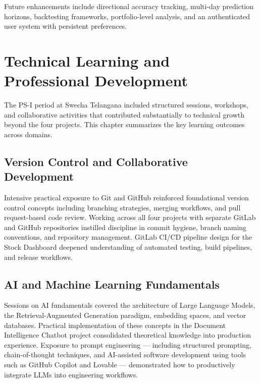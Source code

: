 \documentclass{book}
\begin{document}
\par\noindent Future enhancements include directional accuracy tracking, multi-day prediction horizons, backtesting frameworks, portfolio-level analysis, and an authenticated user system with persistent preferences.

\chapter{Technical Learning and Professional Development}

\par\noindent The PS-I period at Swecha Telangana included structured sessions, workshops, and collaborative activities that contributed substantially to technical growth beyond the four projects. This chapter summarizes the key learning outcomes across domains.

\section{Version Control and Collaborative Development}

\par\noindent Intensive practical exposure to Git and GitHub reinforced foundational version control concepts including branching strategies, merging workflows, and pull request-based code review. Working across all four projects with separate GitLab and GitHub repositories instilled discipline in commit hygiene, branch naming conventions, and repository management. GitLab CI/CD pipeline design for the Stock Dashboard deepened understanding of automated testing, build pipelines, and release workflows.

\section{AI and Machine Learning Fundamentals}

\par\noindent Sessions on AI fundamentals covered the architecture of Large Language Models, the Retrieval-Augmented Generation paradigm, embedding spaces, and vector databases. Practical implementation of these concepts in the Document Intelligence Chatbot project consolidated theoretical knowledge into production experience. Exposure to prompt engineering --- including structured prompting, chain-of-thought techniques, and AI-assisted software development using tools such as GitHub Copilot and Lovable --- demonstrated how to productively integrate LLMs into engineering workflows.
\end{document}

